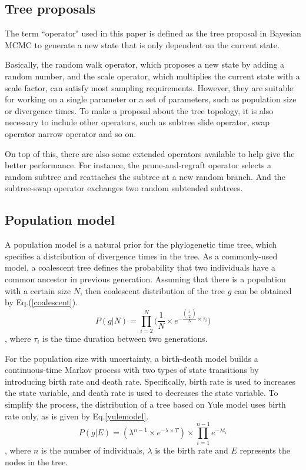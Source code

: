 \documentclass{bmcart}
\begin{document}
\subsection*{Tree proposals}
The term ``operator" used in this paper is defined as the tree proposal in Bayesian MCMC to generate a new state that is only dependent on the current state. 

Basically, the random walk operator, which proposes a new state by adding a random number, and the scale operator, which multiplies the current state with a scale factor, can satisfy most sampling requirements. However, they are suitable for working on a single parameter or a set of parameters, such as population size or divergence times. To make a proposal about the tree topology, it is also necessary to include other operators, such as subtree slide operator, swap operator narrow operator and so on.

On top of this, there are also some extended operators available to help give the better performance. For instance, the prune-and-regraft operator selects a random subtree and reattaches the subtree at a new random branch. And the subtree-swap operator exchanges two random subtended subtrees.
\subsection*{Population model}
A population model is a natural prior for the phylogenetic time tree, which specifies a distribution of divergence times in the tree. As a commonly-used model, a coalescent tree defines the probability that two individuals have a common ancestor in previous generation. Assuming that there is a population with a certain size $N$, then coalescent distribution of the tree $g$ can be obtained by Eq.(\ref{coalescent}).
\begin{equation}\label{coalescent}
P(g|N) = \prod\limits_{i = 2}^N {(\frac{1}{N}}  \times {e^{ - \frac{{\left( {\begin{array}{*{20}{c}}i \\ 2 \end{array}} \right)}}{N} \times {\tau _i}}})
\end{equation}
, where ${\tau _i}$ is the time duration between two generations.

For the population size with uncertainty, a birth-death model builds a continuous-time Markov process with two types of state transitions by introducing birth rate and death rate. Specifically, birth rate is used to increases the state variable, and death rate is used to decreases the state variable. To simplify the process, the distribution of a tree based on Yule model uses birth rate only, as is given by Eq.\ref{yulemodel}.
\begin{equation}\label{yulemodel}
P(g|E) = ({\lambda ^{n - 1}} \times {e^{ - \lambda  \times T}}) \times \prod\limits_{i = 1}^{n - 1} {{e^{ - \lambda {t_i}}}} 
\end{equation}
, where $n$ is the number of individuals, $\lambda$ is the birth rate and $E$ represents the nodes in the tree. 
\end{document}
